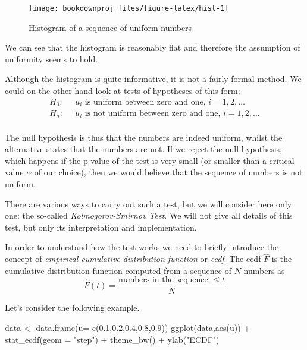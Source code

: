 \documentclass[
]{book}
\newenvironment{Shaded}{\begin{snugshade}}{\end{snugshade}}
\newcommand{\AttributeTok}[1]{\textcolor[rgb]{0.77,0.63,0.00}{#1}}
\newcommand{\FloatTok}[1]{\textcolor[rgb]{0.00,0.00,0.81}{#1}}
\newcommand{\FunctionTok}[1]{\textcolor[rgb]{0.00,0.00,0.00}{#1}}
\newcommand{\NormalTok}[1]{#1}
\newcommand{\OtherTok}[1]{\textcolor[rgb]{0.56,0.35,0.01}{#1}}
\newcommand{\SpecialCharTok}[1]{\textcolor[rgb]{0.00,0.00,0.00}{#1}}
\newcommand{\StringTok}[1]{\textcolor[rgb]{0.31,0.60,0.02}{#1}}
\theoremstyle{definition}
\theoremstyle{definition}
\theoremstyle{definition}
\theoremstyle{definition}
\theoremstyle{remark}
\begin{document}
\begin{figure}

{\centering \texttt{[image: bookdownproj\_files/figure-latex/hist-1]} 

}

\caption{Histogram of a sequence of uniform numbers}\label{fig:hist}
\end{figure}

We can see that the histogram is reasonably flat and therefore the assumption of uniformity seems to hold.

Although the histogram is quite informative, it is not a fairly formal method. We could on the other hand look at tests of hypotheses of this form:
\begin{align*}
H_0: & \;\;u_i \mbox{ is uniform between zero and one, } i=1,2,\dots\\
H_a: & \;\;u_i \mbox{ is not uniform between zero and one, } i=1,2,\dots\\
\end{align*}

The null hypothesis is thus that the numbers are indeed uniform, whilst the alternative states that the numbers are not. If we reject the null hypothesis, which happens if the p-value of the test is very small (or smaller than a critical value \(\alpha\) of our choice), then we would believe that the sequence of numbers is not uniform.

There are various ways to carry out such a test, but we will consider here only one: the so-called \emph{Kolmogorov-Smirnov Test}. We will not give all details of this test, but only its interpretation and implementation.

In order to understand how the test works we need to briefly introduce the concept of \emph{empirical cumulative distribution function} or \emph{ecdf}. The ecdf \(\hat{F}\) is the cumulative distribution function computed from a sequence of \(N\) numbers as
\[
\hat{F}(t)= \frac{\mbox{numbers in the sequence }\leq t}{N}
\]

Let's consider the following example.

\begin{Shaded}
\begin{Highlighting}[]
\NormalTok{data }\OtherTok{\textless{}{-}} \FunctionTok{data.frame}\NormalTok{(}\AttributeTok{u=} \FunctionTok{c}\NormalTok{(}\FloatTok{0.1}\NormalTok{,}\FloatTok{0.2}\NormalTok{,}\FloatTok{0.4}\NormalTok{,}\FloatTok{0.8}\NormalTok{,}\FloatTok{0.9}\NormalTok{))}
\FunctionTok{ggplot}\NormalTok{(data,}\FunctionTok{aes}\NormalTok{(u)) }\SpecialCharTok{+} \FunctionTok{stat\_ecdf}\NormalTok{(}\AttributeTok{geom =} \StringTok{"step"}\NormalTok{) }\SpecialCharTok{+} \FunctionTok{theme\_bw}\NormalTok{() }\SpecialCharTok{+} \FunctionTok{ylab}\NormalTok{(}\StringTok{"ECDF"}\NormalTok{)}
\end{Highlighting}
\end{Shaded}
\end{document}
